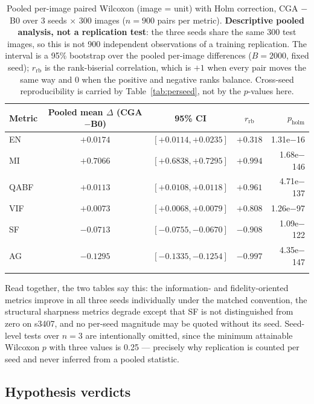 \documentclass[pdflatex,sn-mathphys-num]{sn-jnl}
\theoremstyle{thmstyleone}%
\theoremstyle{thmstyletwo}%
\theoremstyle{thmstylethree}%
\begin{document}
\begin{table}[t]
\caption{Pooled per-image paired Wilcoxon (image = unit) with Holm correction, CGA $-$ B0 over 3 seeds $\times$ 300 images ($n = 900$ pairs per metric). \textbf{Descriptive pooled analysis, not a replication test}: the three seeds share the same 300 test images, so this is not 900 independent observations of a training replication. The interval is a 95\% bootstrap over the pooled per-image differences ($B = 2000$, fixed seed); $r_{\mathrm{rb}}$ is the rank-biserial correlation, which is $+1$ when every pair moves the same way and $0$ when the positive and negative ranks balance. Cross-seed reproducibility is carried by Table~\ref{tab:perseed}, not by the $p$-values here.}
\label{tab:seeds}%
\small
\begin{tabular}{@{}lcccr@{}}
\toprule
Metric & Pooled mean $\Delta$ (CGA$-$B0) & 95\% CI & $r_{\mathrm{rb}}$ & $p_{\mathrm{holm}}$ \\
\midrule
EN & $+0.0174$ & $[+0.0114, +0.0235]$ & $+0.318$ & 1.31e$-$16 \\
MI & $+0.7066$ & $[+0.6838, +0.7295]$ & $+0.994$ & 1.68e$-$146 \\
QABF & $+0.0113$ & $[+0.0108, +0.0118]$ & $+0.961$ & 4.71e$-$137 \\
VIF & $+0.0073$ & $[+0.0068, +0.0079]$ & $+0.808$ & 1.26e$-$97 \\
SF & $-0.0713$ & $[-0.0755, -0.0670]$ & $-0.908$ & 1.09e$-$122 \\
AG & $-0.1295$ & $[-0.1335, -0.1254]$ & $-0.997$ & 4.35e$-$147 \\
\botrule
\end{tabular}
\end{table}

Read together, the two tables say this: the information- and fidelity-oriented metrics improve in all three seeds individually under the matched convention, the structural sharpness metrics degrade except that SF is not distinguished from zero on s3407, and no per-seed magnitude may be quoted without its seed. Seed-level tests over $n = 3$ are intentionally omitted, since the minimum attainable Wilcoxon $p$ with three values is 0.25 --- precisely why replication is counted per seed and never inferred from a pooled statistic.

\subsection{Hypothesis verdicts}\label{sec:exp:verdicts}
\end{document}
